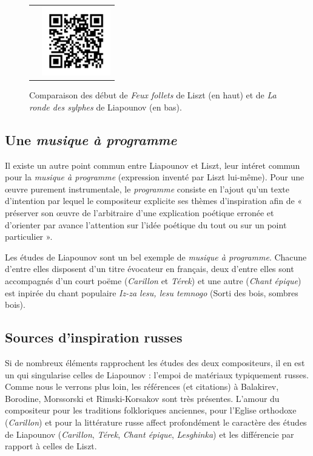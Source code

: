 \begin{figure}[!p]
\begin{bigcenter}
\begin{tabular}{lr}
      &
      \includegraphics[width=3cm, keepaspectratio]{op11-xi-qr.png}
    \end{tabular}
  \end{bigcenter}
  \caption{\label{op11-xi}Comparaison des début de \emph{Feux follets} de Liszt (en haut) et de \emph{La ronde des sylphes} de Liapounov (en bas).}
\end{figure}

\subsection{Une \emph{musique à programme}}

Il existe un autre point commun entre Liapounov et Liszt, leur intéret commun pour la \emph{musique à programme} (expression inventé par Liszt lui-même). Pour une œuvre purement instrumentale, le \emph{programme} consiste en l'ajout qu'un texte d'intention par lequel le compositeur explicite ses thèmes d'inspiration afin de « préserver son œuvre de l'arbitraire d'une explication poétique erronée et d'orienter par avance l'attention sur l'idée poétique du tout ou sur un point particulier ».

Les études de Liapounov sont un bel exemple de \emph{musique à programme}. Chacune d'entre elles disposent d'un titre évocateur en français, deux d'entre elles sont accompagnés d'un court poëme (\emph{Carillon} et \emph{Térek}) et une autre (\emph{Chant épique}) est inpirée du chant populaire \emph{Iz-za lesu, lesu temnogo} (Sorti des bois, sombres bois). 

\subsection{Sources d'inspiration russes}

Si de nombreux éléments rapprochent les études des deux compositeurs, il en est un qui singularise celles de Liapounov : l'empoi de matériaux typiquement russes. Comme nous le verrons plus loin, les références (et citations) à Balakirev, Borodine, Morssorski et Rimski-Korsakov sont très présentes. L'amour du compositeur pour les traditions folkloriques anciennes, pour l'Eglise orthodoxe (\emph{Carillon}) et pour la littérature russe affect profondément le caractère des études de Liapounov (\emph{Carillon}, \emph{Térek}, \emph{Chant épique}, \emph{Lesghinka}) et les différencie par rapport à celles de Liszt.

